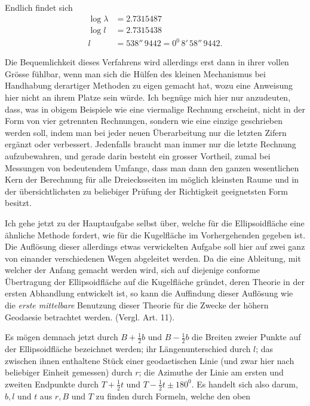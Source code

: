 %
Endlich findet sich
\[
\begin{aligned}
\log\lambda&=2.7315487\\
\log l&=2.7315438\\
l&=538''\,9442=0^0\,8'\,58''\,9442.
\end{aligned}
\]

\indent Die Bequemlichkeit dieses Verfahrens wird allerdings erst dann in ihrer vollen Grösse fühlbar, wenn man sich die Hülfen des kleinen Mechanismus bei Handhabung derartiger Methoden zu eigen gemacht hat, wozu eine Anweisung hier nicht an ihrem Platze sein würde. Ich begnüge mich hier nur anzudeuten, dass, was in obigem Beispiele wie eine viermalige Rechnung erscheint, nicht in der Form von vier getrennten Rechnungen, sondern wie eine einzige geschrieben werden soll, indem man bei jeder neuen Überarbeitung nur die letzten Zifern ergänzt oder verbessert. Jedenfalls braucht man immer nur die letzte Rechnung aufzubewahren, und gerade darin besteht ein grosser Vortheil, zumal bei Messungen von bedeutendem Umfange, dass man dann den ganzen wesentlichen Kern der Berechnung für alle Dreiecksseiten im möglich kleinsten Raume und in der übersichtlichsten zu beliebiger Prüfung der Richtigkeit geeignetsten Form besitzt.

Ich gehe jetzt zu der Hauptaufgabe selbst über, welche für die Ellipsoidfläche eine ähnliche Methode fordert, wie für die Kugelfläche im Vorhergehenden gegeben ist. Die Auflösung dieser allerdings etwas verwickelten Aufgabe soll hier auf zwei ganz von einander verschiedenen Wegen abgeleitet werden. Da die eine Ableitung, mit welcher der Anfang gemacht werden wird, sich auf diejenige conforme Übertragung der Ellipsoidfläche auf die Kugelfläche gründet, deren Theorie in der ersten Abhandlung entwickelt ist, so kann die Auffindung dieser Auflösung wie die \textit{erste mittelbare} Benutzung dieser Theorie für die Zwecke der höhern Geodaesie betrachtet werden. (Vergl. Art. 11).

Es mögen demnach jetzt durch \(B+\frac12b\) und \(B-\frac12b\) die Breiten zweier Punkte auf der Ellipsoidfläche bezeichnet werden; ihr Längenunterschied durch \(l\); das zwischen ihnen enthaltene Stück einer geodaetischen Linie (und zwar hier nach beliebiger Einheit gemessen) durch \(r\); die Azimuthe der Linie am ersten und zweiten Endpunkte durch \(T+\frac12t\) und \(T-\frac12t\pm180^0\). Es handelt sich also darum, \(b,l\) und \(t\) aus \(r,B\) und \(T\) zu finden durch Formeln, welche den oben
